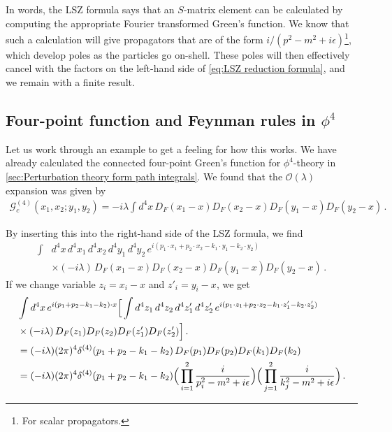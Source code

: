 In words, the LSZ formula says that an $S$-matrix element can be calculated by computing the appropriate Fourier transformed Green's function. We know that such a calculation will give propagators that are of the form $i/(p^{2}-m^{2}+i\epsilon)$\footnote{For scalar propagators.}, which develop poles as the particles go on-shell. These poles will then effectively cancel with the factors on the left-hand side of \cref{eq:LSZ reduction formula}, and we remain with a finite result. 

\subsection*{Four-point function and Feynman rules in $\phi^{4}$}
Let us work through an example to get a feeling for how this works. We have already calculated the connected four-point Green's function for $\phi^{4}$-theory in \cref{sec:Perturbation theory form path integrals}. We found that the $\mathcal{O}(\lambda)$ expansion was given by
\begin{align}
    \mathcal{G}_{c}^{(4)}(x_1,x_2;y_1,y_2)=-i\lambda\int d^{4}x\,D_{F}(x_1-x)D_{F}(x_2-x)D_{F}(y_1-x)D_{F}(y_2-x)\,.
\end{align}

By inserting this into the right-hand side of the LSZ formula, we find
\begin{align}
    \int &d^{4}x\,d^{4}x_1\,d^{4}x_2\,d^{4}y_1\,d^{4}y_2\,e^{i(p_1\cdot x_1+p_2\cdot x_2-k_1\cdot y_1-k_2\cdot y_2)}\nonumber
    \\
    &\times (-i\lambda)\,D_{F}(x_1-x)D_{F}(x_2-x)D_{F}(y_1-x)D_{F}(y_2-x)\,.
\end{align}
If we change variable $z_i=x_i-x$ and $z'_i=y_i-x$, we get
\begin{align}
    &\int d^{4}x\,e^{i(p_1+p_2-k_1-k_2)\cdot x}\Big[\int d^{4}z_1\,d^{4}z_2\,d^{4}z'_1\,d^{4}z'_2\,e^{i(p_1\cdot z_1+p_2\cdot z_2-k_1\cdot z'_1-k_2\cdot z'_2)}\nonumber \\&\times(-i\lambda)\,D_{F}(z_1)D_{F}(z_2)D_{F}(z'_1)D_{F}(z'_2)\Big]\,.\nonumber
    \\\vspace{0.2cm}
    &=(-i\lambda)(2\pi)^{4}\delta^{(4)}(p_1+p_2-k_1-k_2)\,D_{F}(p_1)D_{F}(p_2)D_{F}(k_1)D_{F}(k_2)\nonumber
    \\
    &=(-i\lambda)(2\pi)^{4}\delta^{(4)}(p_1+p_2-k_1-k_2)\Big(\prod_{i=1}^{2}\frac{i}{p_{i}^{2}-m^{2}+i\epsilon}\Big)\Big(\prod_{j=1}^{2}\frac{i}{k_{j}^{2}-m^{2}+i\epsilon}\Big)\,.
\end{align}


